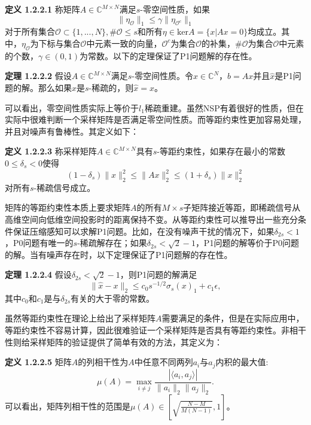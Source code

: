 \noindent\textbf{定义 1.2.2.1} 称矩阵$A\in \mathbb{C}^{M\times N}$满足$s$-零空间性质，如果
$$\|\eta_\mathcal{O}\|_1\leq \gamma\|\eta_{\mathcal{O}^c}\|_1$$
对于所有集合$\mathcal{O}\subset\{1,...,N\},\#\mathcal{O}\leq s$和所有$\eta\in \mathrm{ker}A=\{x|Ax=0\}$均成立。其中，$\eta_\mathcal{O}$为下标与集合$\mathcal{O}$中元素一致的向量，$\mathcal{O}^c$为集合$\mathcal{O}$的补集，$\#\mathcal{O}$为集合$\mathcal{O}$中元素的个数，$\gamma\in (0,1)$为常数。以下的定理保证了P1问题解的存在性。

\noindent\textbf{定理 1.2.2.2} 假设$A\in \mathbb{C}^{M\times N}$满足$s$-零空间性质。令$x\in \mathbb{C}^N$，$b=Ax$并且$\hat{x}$是P1问题的解。那么如果$x$是$s$-稀疏的，则$\hat{x}=x$。

可以看出，零空间性质实际上等价于$l_1$稀疏重建。虽然NSP有着很好的性质，但在实际中很难判断一个采样矩阵是否满足零空间性质。而等距约束性更加容易处理，并且对噪声有鲁棒性。其定义如下：

\noindent\textbf{定义 1.2.2.3} 称采样矩阵$A\in \mathbb{C}^{M\times N}$具有$s$-等距约束性，如果存在最小的常数$0\leq\delta_s<0$使得
\begin{equation}
	(1-\delta_s)\|x\|_2^2\leq \|Ax\|_2^2\leq (1+\delta_s)\|x\|^2_2
\end{equation}
对所有$s$-稀疏信号成立。

矩阵的等距约束性本质上要求矩阵$A$的所有$M\times s$子矩阵接近等距，即稀疏信号从高维空间向低维空间投影时的距离保持不变。从等距约束性可以推导出一些充分条件保证压缩感知可以求解P1问题。比如，在没有噪声干扰的情况下，如果$\delta_{2s}<1$，P0问题有唯一的$s$-稀疏解存在；如果$\delta_{2s}<\sqrt{2}-1$，P1问题的解等价于P0问题的解。当有噪声存在时，以下定理保证了P1问题解的存在性。

\noindent\textbf{定理 1.2.2.4} 假设$\delta_{2s}<\sqrt{2}-1$，则P1问题的解满足
$$\|\hat{x}-x\|_2\leq c_0s^{-1/2}\sigma_s(x)_1+c_1\epsilon,$$
其中$c_0$和$c_1$是与$\delta_{2s}$有关的大于零的常数。

虽然等距约束性在理论上给出了采样矩阵$A$需要满足的条件，但是在实际应用中，等距约束性不容易计算，因此很难验证一个采样矩阵是否具有等距约束性。非相干性则给采样矩阵的验证提供了简单有效的方法，其定义为：

\noindent\textbf{定义 1.2.2.5} 
矩阵$A$的列相干性为$A$中任意不同两列$a_i$与$a_j$内积的最大值:
\begin{equation}
	\mu(A) = \max_{i\neq j}\frac{|\langle a_i,a_j\rangle|}{\|a_i\|_2\|a_j\|_2}.
\end{equation}
可以看出，矩阵列相干性的范围是$\mu(A)\in [\sqrt{\frac{N-M}{M(N-1)}},1]$。

